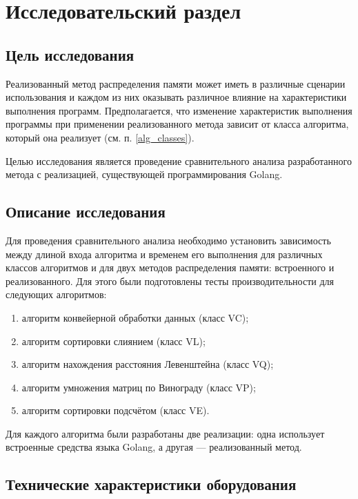 \chapter{Исследовательский раздел}



\section{Цель исследования}

Реализованный метод распределения памяти может иметь в различные сценарии использования и каждом из них оказывать различное влияние на характеристики выполнения программ. Предполагается, что изменение характеристик выполнения программы при применении реализованного метода зависит от класса алгоритма, который она реализует (см. п. \ref{alg_classes}).

Целью исследования является проведение сравнительного анализа разработанного метода с реализацией, существующей программирования Golang.

\section{Описание исследования}

Для проведения сравнительного анализа необходимо установить зависимость между длиной входа алгоритма и временем его выполнения для различных классов алгоритмов и для двух методов распределения памяти: встроенного и реализованного. Для этого были подготовлены тесты производительности для следующих алгоритмов:

\begin{enumerate}[label*=\arabic*)]
	\item алгоритм конвейерной обработки данных (класс VC);
	\item алгоритм сортировки слиянием (класс VL);
	\item алгоритм нахождения расстояния Левенштейна (класс VQ);
	\item алгоритм умножения матриц по Винограду (класс VP);
	\item алгоритм сортировки подсчётом (класс VE).
\end{enumerate}

Для каждого алгоритма были разработаны две реализации: одна использует встроенные средства языка Golang, а другая --- реализованный метод.



\section{Технические характеристики оборудования}

